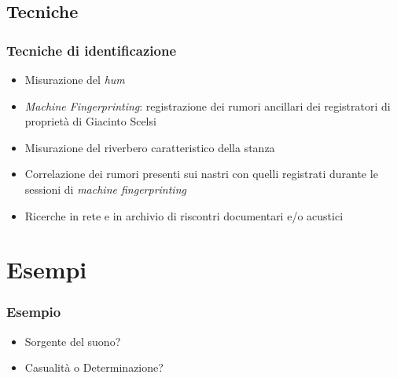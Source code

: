\documentclass[compress,xcolor=dvipsnames]{beamer}
\newcommand{\Scelsi}{Giacinto Scelsi\xspace}
\begin{document}
\subsection{Tecniche}
\begin{frame}
	\frametitle{Tecniche di identificazione}

	\begin{itemize}%

    \item Misurazione del \emph{hum}

		\item \emph{Machine Fingerprinting}: registrazione dei rumori
		ancillari dei registratori di propriet\`a di \Scelsi

		\item Misurazione del riverbero caratteristico della stanza

		\item Correlazione dei rumori presenti sui nastri con quelli
		      registrati durante le sessioni di \emph{machine
			  fingerprinting}

		\item Ricerche in rete e in archivio di riscontri documentari
		      e/o acustici

	\end{itemize}

\end{frame}

\section{Esempi}

\setcounter{ms}{1}
\begin{frame}
	\frametitle{Esempio }

	\begin{center}
	\href{run:\exampledir/33bis-A04@9,5.aup}
  {}
	\end{center}

	\begin{itemize}%

		\item Sorgente del suono?

		\item Casualit\`a o Determinazione?

	\end{itemize}

\end{frame}
\end{document}
